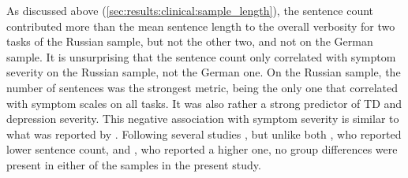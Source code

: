 As discussed above (\ref{sec:results:clinical:sample_length}), the sentence count contributed more than the mean sentence length to the overall verbosity for two tasks of the Russian sample, but not the other two, and not on the German sample. It is unsurprising that the sentence count only correlated with symptom severity on the Russian sample, not the German one. On the Russian sample, the number of sentences was the strongest metric, being the only one that correlated with symptom scales on all tasks. It was also rather a strong predictor of TD and depression severity. This negative association with symptom severity is similar to what was reported by \citet{jeong2023exploring}. Following several studies \citep{gupta2018automated, tang2021natural, schneider2023syntactic}, but unlike both \citet{iter2018automatic}, who reported lower sentence count, and \citet{morgan2021natural, nettekoven2023semantic}, who reported a higher one, no group differences were present in either of the samples in the present study.


